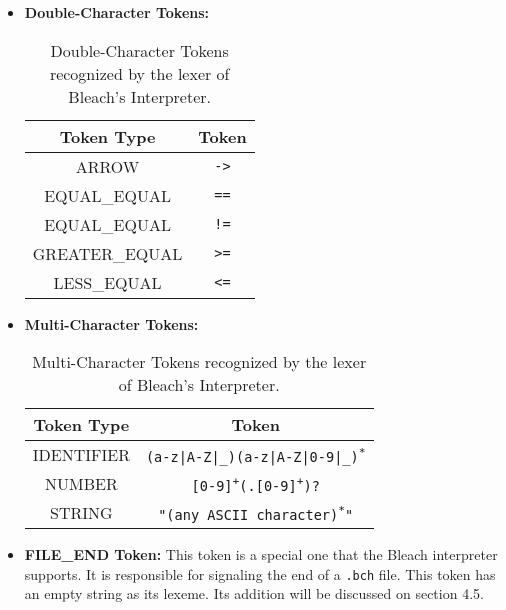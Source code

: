 \begin{itemize}
    \item \textbf{Double-Character Tokens:}
    \begin{table}[h!]
    \centering
        \begin{tabular}{|c|c|}
        \hline
        \textbf{Token Type} & \textbf{Token} \\ \hline
        ARROW & \texttt{->} \\
        EQUAL\_EQUAL & \texttt{==} \\
        EQUAL\_EQUAL & \texttt{!=} \\
        GREATER\_EQUAL & \texttt{>=} \\
        LESS\_EQUAL & \texttt{<=} \\ \hline     
        \end{tabular}
        \caption{Double-Character Tokens recognized by the lexer of Bleach's Interpreter.}
    \end{table}

    \newpage

    \item \textbf{Multi-Character Tokens:}
    \begin{table}[h!]
    \centering
        \begin{tabular}{|c|c|}
        \hline
        \textbf{Token Type} & \textbf{Token} \\ \hline
        IDENTIFIER & \texttt{(a-z|A-Z|\_)(a-z|A-Z|0-9|\_)\textsuperscript{*}} \\
        NUMBER & \texttt{[0-9]\textsuperscript{+}(.[0-9]\textsuperscript{+})?} \\
        STRING & \texttt{"(any ASCII character)\textsuperscript{*}"} \\ \hline      
        \end{tabular}
        \caption{Multi-Character Tokens recognized by the lexer of Bleach's Interpreter.}
    \end{table}

    \item \textbf{FILE\_END Token:} This token is a special one that the Bleach interpreter supports. It is responsible for signaling the end of a \texttt{.bch} file. This token has an empty string as its lexeme. Its addition will be discussed on section 4.5.
\end{itemize}

